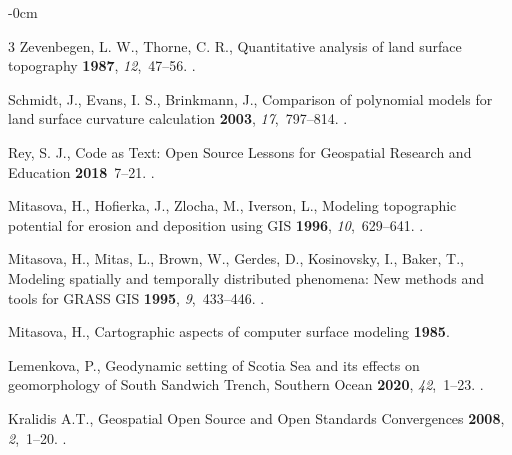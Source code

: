\documentclass[technologies,article,submit,pdftex,moreauthors]{Definitions/mdpi}
\begin{document}
\begin{adjustwidth}{-\extralength}{0cm}
\begin{thebibliography}{3}
Zevenbegen, L. W., Thorne, C. R.,
\newblock Quantitative analysis of land surface topography
 {\bf 1987}, {\em 12},~47--56. 
.

Schmidt, J., Evans, I. S., Brinkmann, J.,
\newblock Comparison of polynomial models for land surface curvature calculation
 {\bf 2003}, {\em 17},~797--814. 
.

Rey, S. J.,
\newblock Code as Text: Open Source Lessons for Geospatial Research and Education
 {\bf 2018}~7--21. 
.

Mitasova, H., Hofierka, J., Zlocha, M., Iverson, L.,
\newblock Modeling topographic potential for erosion and deposition using GIS
 {\bf 1996}, {\em 10},~629--641. 
.

Mitasova, H., Mitas, L., Brown, W., Gerdes, D., Kosinovsky, I., Baker, T.,
\newblock Modeling spatially and temporally distributed phenomena: New methods and tools for GRASS GIS
 {\bf 1995}, {\em 9},~433--446. 
.

Mitasova, H., 
\newblock Cartographic aspects of computer surface modeling
 {\bf 1985}.

Lemenkova, P.,
\newblock Geodynamic setting of Scotia Sea and its effects on geomorphology of South Sandwich Trench, Southern Ocean
 {\bf 2020}, {\em 42},~1--23. 
.

Kralidis A.T., 
\newblock Geospatial Open Source and Open Standards Convergences
 {\bf 2008}, {\em 2},~1--20. 
.

 
\end{thebibliography}
%

\end{adjustwidth}
\end{document}
